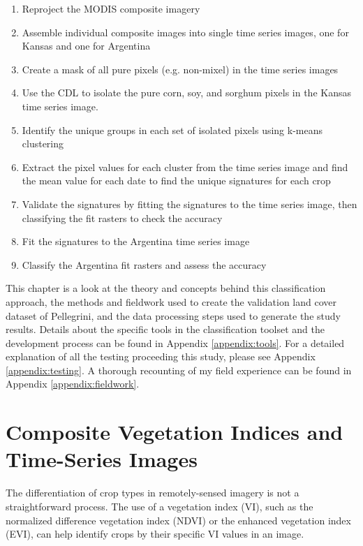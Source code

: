 \begin{Spacing}{1.2}
\begin{enumerate}
  \item Reproject the MODIS composite imagery
  \item Assemble individual composite images into single time series images, one for Kansas and one for Argentina
  \item Create a mask of all pure pixels (e.g. non-mixel) in the time series images
  \item Use the CDL to isolate the pure corn, soy, and sorghum pixels in the Kansas time series image.
  \item Identify the unique groups in each set of isolated pixels using k-means clustering
  \item Extract the pixel values for each cluster from the time series image and find the mean value for each date to find the unique signatures for each crop
  \item Validate the signatures by fitting the signatures to the time series image, then classifying the fit rasters to check the accuracy
  \item Fit the signatures to the Argentina time series image
  \item Classify the Argentina fit rasters and assess the accuracy
\end{enumerate}
\end{Spacing}

This chapter is a look at the theory and concepts behind this classification approach, the methods and fieldwork used to create the validation land cover dataset of Pellegrini, and the data processing steps used to generate the study results. Details about the specific tools in the classification toolset and the development process can be found in Appendix \ref{appendix:tools}. For a detailed explanation of all the testing proceeding this study, please see Appendix \ref{appendix:testing}. A thorough recounting of my field experience can be found in Appendix \ref{appendix:fieldwork}.

\section{Composite Vegetation Indices and Time-Series Images}

The differentiation of crop types in remotely-sensed imagery is not a straightforward process. The use of a vegetation index (VI), such as the normalized difference vegetation index (NDVI) or the enhanced vegetation index (EVI), can help identify crops by their specific VI values in an image.


